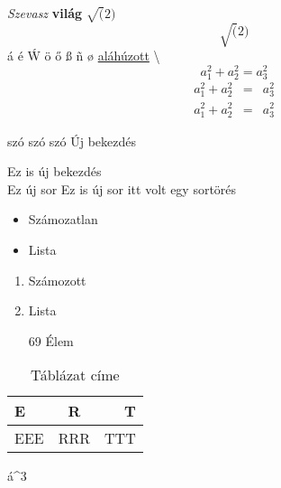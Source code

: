 \documentclass[]{article}
\begin{document}
	\textit{Szevasz} \textbf{világ} $\sqrt(2)$
	 $$\sqrt(2)$$
	 \'a \'e \'W
	 \"o
	 \H{o}
	 \ss
	 \~n
	 \o
	 \underline{aláhúzott}
	\textbackslash
	\begin{equation}
		a_1^2+a_2^2=a_3^2\label{eq:equation}
	\end{equation}
	\begin{eqnarray}
		a_1^2+a_2^2&=&a_3^2\\
		a_1^2+a_2^2&=&a_3^2
	\end{eqnarray}
	\iffalse
	Ez a rész egy komment
	és többsoros.
	\fi
	\begin{flushleft}
		\blindtext
	\end{flushleft}
	\begin{center}
		\blindtext
	\end{center}
	szó  szó                    szó
	Új bekezdés \par
	Ez is új bekezdés\\
	Ez új sor \newline
	Ez is új sor \linebreak
	itt volt egy sortörés
	\begin{itemize}
		\item Számozatlan
		\item Lista
	\end{itemize}
	\begin{enumerate}
		\item Számozott
		\item Lista
		\item[69] Élem
	\end{enumerate}
	\begin{table}
		\caption{Táblázat címe}
		\begin{tabular}{|l||cr|}
			E&R&T\\ \hline
			EEE&RRR&TTT\\ \hline
		\end{tabular}\label{tab:table}
	\end{table}
	\'a^3
\end{document}
